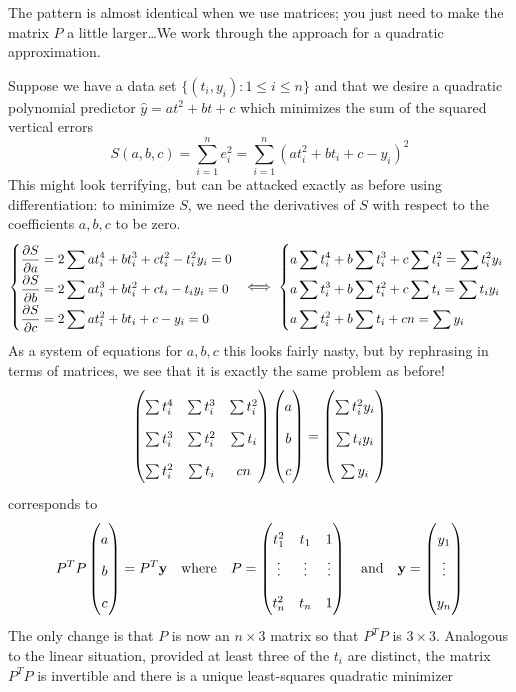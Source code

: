 \goodbreak


The pattern is almost identical when we use matrices; you just need to make the matrix $P$ a little larger\ldots We work through the approach for a quadratic approximation.\smallbreak

Suppose we have a data set $\{(t_i,y_i):1\le i\le n\}$ and that we desire a quadratic polynomial predictor $\hat y=at^2+bt+c$ which minimizes the sum of the squared vertical errors
\[S(a,b,c)=\sum_{i=1}^n e_i^2=\sum_{i=1}^n(at_i^2+bt_i+c-y_i)^2\]
This might look terrifying, but can be attacked exactly as before using differentiation: to minimize $S$, we need the derivatives of $S$ with respect to the coefficients $a,b,c$ to be zero.
\begin{gather*}\def\arraystretch{1.9}
\left\{\begin{array}{@{}lll}
\displaystyle\partials[S]{a}=2\sum at_i^4+bt_i^3+ct_i^2-t_i^2y_i=0\\
\displaystyle\partials[S]{b}=2\sum at_i^3+bt_i^2+ct_i-t_iy_i=0\\
\displaystyle\partials[S]{c}=2\sum at_i^2+bt_i+c-y_i=0
\end{array}\right.
\iff
\left\{\begin{array}{@{}lll}
\displaystyle a\sum t_i^4+b\sum t_i^3+c\sum t_i^2=\sum t_i^2y_i\\
\displaystyle a\sum t_i^3+b\sum t_i^2+c\sum t_i=\sum t_iy_i\\
\displaystyle a\sum t_i^2+b\sum t_i+cn=\sum y_i
\end{array}\right.
\end{gather*}
As a system of equations for $a,b,c$ this looks fairly nasty, but by rephrasing in terms of matrices, we see that it is exactly the same problem as before!
\[
\begin{pmatrix}
\sum t_i^4 & \sum t_i^3 & \sum t_i^2\\
\sum t_i^3 & \sum t_i^2 & \sum t_i\\
\sum t_i^2 & \sum t_i & cn
\end{pmatrix}\threevec abc=\threevec{\sum t_i^2y_i}{\sum t_iy_i}{\sum y_i}
\]
corresponds to
\[
P^TP\threevec abc=P^T\vy\quad\text{where}\quad P=\begin{pmatrix}
t_1^2&t_1&1\\
\vdots&\vdots&\vdots\\
t_n^2&t_n&1
\end{pmatrix}\quad \text{and}
\quad\vy=\threevec{y_1}{\vdots}{y_n}
\]
The only change is that $P$ is now an $n\times 3$ matrix so that $P^TP$ is $3\times 3$. Analogous to the linear situation, provided at least three of the $t_i$ are distinct, the matrix $P^TP$ is invertible and there is a unique least-squares quadratic minimizer
